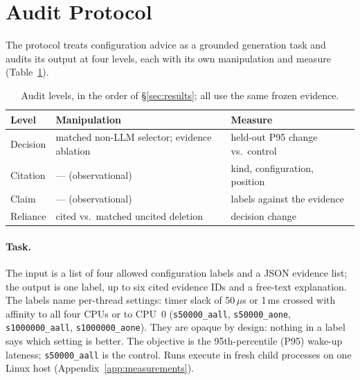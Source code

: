 \section{Audit Protocol}
\label{sec:protocol}
\label{sec:evaluation}
The protocol treats configuration advice as a grounded generation task and audits its output at four levels, each with its own manipulation and measure (Table~\ref{tab:protocol}).

\begin{table}[t]
\centering\footnotesize\setlength{\tabcolsep}{3pt}
\caption{Audit levels, in the order of \S\ref{sec:results}; all use the same frozen evidence.}
\label{tab:protocol}
\begin{tabular}{@{}l>{\raggedright\arraybackslash}p{}>{\raggedright\arraybackslash}p{}@{}}
\toprule
Level & Manipulation & Measure \\
\midrule
Decision & matched non-LLM selector; evidence ablation & held-out P95 change vs.\ control \\
Citation & --- (observational) & kind, configuration, position \\
Claim & --- (observational) & labels against the evidence \\
Reliance & cited vs.\ matched uncited deletion & decision change \\
\bottomrule
\end{tabular}
\end{table}

\paragraph{Task.}
The input is a list of four allowed configuration labels and a JSON evidence list; the output is one label, up to six cited evidence IDs and a free-text explanation. The labels name per-thread settings: timer slack of 50\,$\mu$s or 1\,ms crossed with affinity to all four CPUs or to CPU~0 (\texttt{s50000\_aall}, \texttt{s50000\_aone}, \texttt{s1000000\_aall}, \texttt{s1000000\_aone}). They are opaque by design: nothing in a label says which setting is better. The objective is the 95th-percentile (P95) wake-up lateness; \texttt{s50000\_aall} is the control. Runs execute in fresh child processes on one Linux host (Appendix~\ref{app:measurements}).

